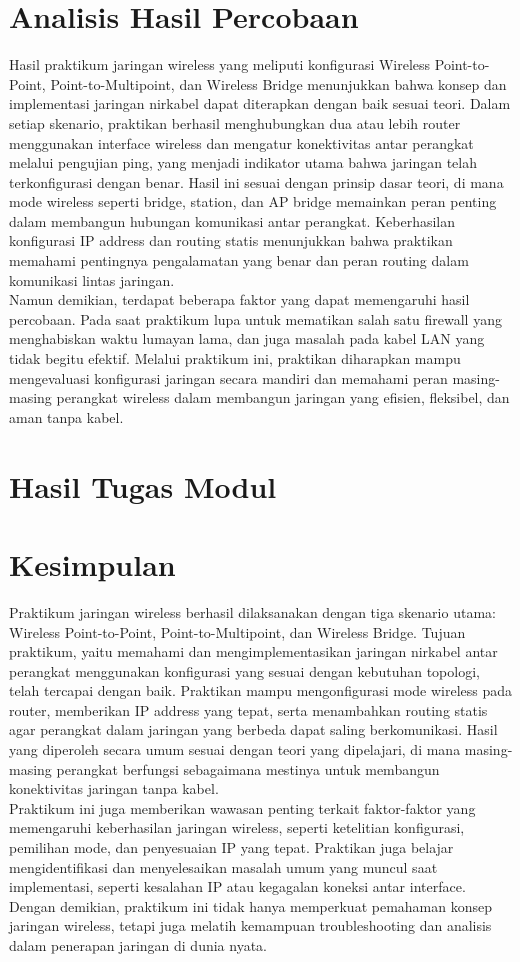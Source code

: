 \section{Analisis Hasil Percobaan}
Hasil praktikum jaringan wireless yang meliputi konfigurasi Wireless Point-to-Point, Point-to-Multipoint, dan Wireless Bridge menunjukkan bahwa konsep dan implementasi jaringan nirkabel dapat diterapkan dengan baik sesuai teori. Dalam setiap skenario, praktikan berhasil menghubungkan dua atau lebih router menggunakan interface wireless dan mengatur konektivitas antar perangkat melalui pengujian ping, yang menjadi indikator utama bahwa jaringan telah terkonfigurasi dengan benar. Hasil ini sesuai dengan prinsip dasar teori, di mana mode wireless seperti bridge, station, dan AP bridge memainkan peran penting dalam membangun hubungan komunikasi antar perangkat. Keberhasilan konfigurasi IP address dan routing statis menunjukkan bahwa praktikan memahami pentingnya pengalamatan yang benar dan peran routing dalam komunikasi lintas jaringan. \\ Namun demikian, terdapat beberapa faktor yang dapat memengaruhi hasil percobaan. Pada saat praktikum lupa untuk mematikan salah satu firewall yang menghabiskan waktu lumayan lama, dan juga masalah pada kabel LAN yang tidak begitu efektif. Melalui praktikum ini, praktikan diharapkan mampu mengevaluasi konfigurasi jaringan secara mandiri dan memahami peran masing-masing perangkat wireless dalam membangun jaringan yang efisien, fleksibel, dan aman tanpa kabel.

\section{Hasil Tugas Modul}

\section{Kesimpulan}
Praktikum jaringan wireless berhasil dilaksanakan dengan tiga skenario utama: Wireless Point-to-Point, Point-to-Multipoint, dan Wireless Bridge. Tujuan praktikum, yaitu memahami dan mengimplementasikan jaringan nirkabel antar perangkat menggunakan konfigurasi yang sesuai dengan kebutuhan topologi, telah tercapai dengan baik. Praktikan mampu mengonfigurasi mode wireless pada router, memberikan IP address yang tepat, serta menambahkan routing statis agar perangkat dalam jaringan yang berbeda dapat saling berkomunikasi. Hasil yang diperoleh secara umum sesuai dengan teori yang dipelajari, di mana masing-masing perangkat berfungsi sebagaimana mestinya untuk membangun konektivitas jaringan tanpa kabel. \\ Praktikum ini juga memberikan wawasan penting terkait faktor-faktor yang memengaruhi keberhasilan jaringan wireless, seperti ketelitian konfigurasi, pemilihan mode, dan penyesuaian IP yang tepat. Praktikan juga belajar mengidentifikasi dan menyelesaikan masalah umum yang muncul saat implementasi, seperti kesalahan IP atau kegagalan koneksi antar interface. Dengan demikian, praktikum ini tidak hanya memperkuat pemahaman konsep jaringan wireless, tetapi juga melatih kemampuan troubleshooting dan analisis dalam penerapan jaringan di dunia nyata.

